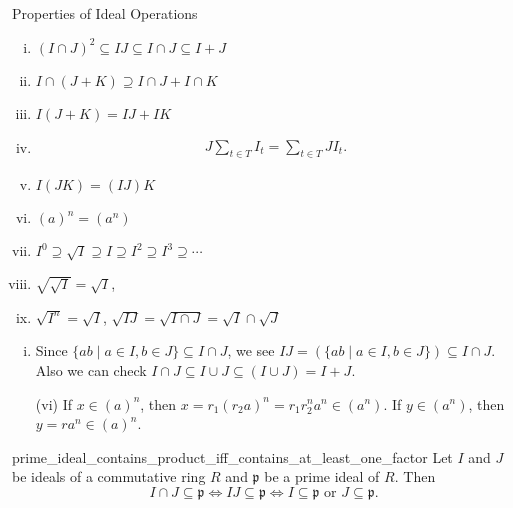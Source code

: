 \begin{proposition}{Properties of Ideal Operations}{}
    \begin{enumerate}[(i)]
        \item $(I\cap J)^2 \subseteq I J \subseteq I \cap J \subseteq I+J$
        \item ${I} \cap({J}+{K}) \supseteq {I} \cap {J}+{I} \cap {K}$
        \item ${I} ({J}+{K}) = {I}  {J}+{I}  {K}$
        \item $$
        \begin{gathered}
        J\sum_{t \in T} I_t=\sum_{t \in T} J I_t.
        \end{gathered}
        $$
        \item $I(J K)=(I J) K$
        \item $(a)^n=(a^n)$
        \item $I^0 \supseteq \sqrt{I} \supseteq I \supseteq I^2 \supseteq I^3 \supseteq \cdots$
        \item $\sqrt{\sqrt{I}} = \sqrt{I}$,
        \item $\sqrt{I^n}=\sqrt{I}$, $\sqrt{I J}=\sqrt{I \cap J}=\sqrt{I} \cap \sqrt{J}$
    \end{enumerate}
\end{proposition}

\begin{prf}
    \begin{enumerate}[(i)]
        \item Since $\{ab\mid a\in I,b\in J\}\subseteq I\cap J$, we see $IJ=\left(\{ab\mid a\in I,b\in J\}\right)\subseteq I\cap J$. Also we can check $I \cap J \subseteq I \cup J\subseteq (I \cup J)=I+J$.
        \item[(vi)] If $x\in(a)^n$, then $x=r_1(r_2a)^n=r_1r_2^na^n\in(a^n)$. If $y\in(a^n)$, then $y=ra^n\in(a)^n$.
    \end{enumerate}
\end{prf}


\begin{proposition}{}{prime_ideal_contains_product_iff_contains_at_least_one_factor}
    Let $I$ and $J$ be ideals of a commutative ring $R$ and $\mathfrak{p}$ be a prime ideal of $R$. Then 
    \[
        I\cap J\subseteq \mathfrak{p}\iff IJ\subseteq \mathfrak{p}\iff I\subseteq \mathfrak{p}\text{ or }J\subseteq \mathfrak{p}.
    \]
\end{proposition}

